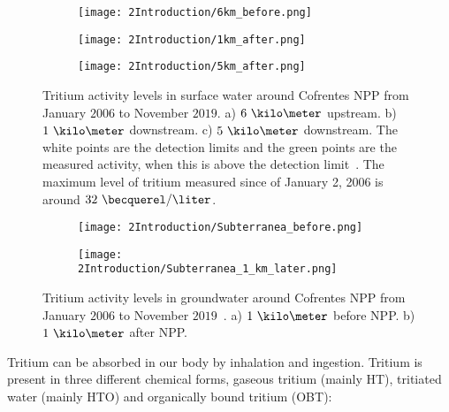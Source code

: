\begin{figure}
\centering
    \begin{subfigure}[b]{0.7\textwidth}
    \centering
    \texttt{[image: 2Introduction/6km\_before.png]}  
    \caption{\label{subfig:TritiumL6kB}}
    \end{subfigure}
    \hfill
    \begin{subfigure}[b]{0.7\textwidth}
    \centering
    \texttt{[image: 2Introduction/1km\_after.png]}  
    \caption{\label{subfig:TritiumL1kA}}
    \end{subfigure}
    \hfill
    \begin{subfigure}[b]{0.7\textwidth}
    \centering
    \texttt{[image: 2Introduction/5km\_after.png]}  
    \caption{\label{subfig:TritiumL5kA}}
    \end{subfigure}
 \caption{Tritium activity levels in surface water around Cofrentes NPP from January $2006$ to November $2019$. a) $6~\kilo\meter$ upstream. b) $1~\kilo\meter$ downstream. c) $5~\kilo\meter$ downstream. The white points are the detection limits and the green points are the measured activity, when this is above the detection limit~\cite{REM}. The maximum level of tritium measured since of January 2, 2006 is around $32~\becquerel/\liter$.}
 \label{subfig:MeasurementsCofrentesSurface}
\end{figure}

\begin{figure}
\centering
    \begin{subfigure}[b]{0.7\textwidth}
    \centering
    \texttt{[image: 2Introduction/Subterranea\_before.png]}  
    \caption{\label{subfig:TritiumLG1kB}}
    \end{subfigure}
    \hfill
    \begin{subfigure}[b]{0.7\textwidth}
    \centering
    \texttt{[image: 2Introduction/Subterranea\_1\_km\_later.png]}  
    \caption{\label{subfig:TritiumLG1kA}}
    \end{subfigure}
 \caption{Tritium activity levels in groundwater around Cofrentes NPP from January $2006$ to November $2019$~\cite{REM}. a) $1~\kilo\meter$ before NPP. b) $1~\kilo\meter$ after NPP.}
 \label{fig:MeasurementsCofrentesGroundWater}
\end{figure}

Tritium can be absorbed in our body by inhalation and ingestion. Tritium is present in three different chemical forms, gaseous tritium (mainly HT), tritiated water (mainly HTO) and organically bound tritium (OBT):

